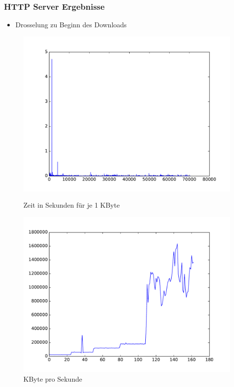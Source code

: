 \documentclass[handout]{beamer}
\begin{document}
\begin{frame}
\frametitle{HTTP Server Ergebnisse}
\begin{itemize}
\item Drosselung zu Beginn des Downloads
\end{itemize}

\begin{figure}
\centering
\begin{minipage}[t]{0.4\linewidth}
			\centering
			\includegraphics[width=\linewidth]{images/seconds_http.pdf}
			\caption{Zeit in Sekunden für je 1 KByte}
\end{minipage}
\begin{minipage}[t]{0.4\linewidth}
			\centering
			\includegraphics[width=\linewidth]{images/datarate_http.pdf}
			\caption{KByte pro Sekunde}
\end{minipage}
\end{figure}
\end{frame}
\end{document}
